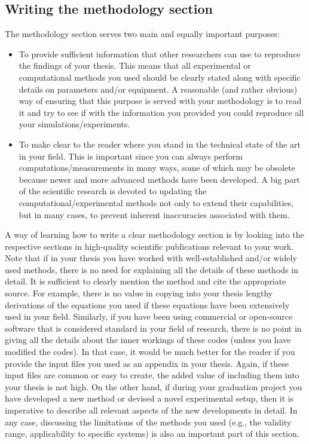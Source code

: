 \documentclass{article}
\begin{document}
\subsection{Writing the methodology section}
The methodology section serves two main and equally important purposes:
\begin{itemize}
    \item To provide sufficient information that other researchers can use to reproduce the findings of your thesis. This means that all experimental or computational methods you used should be clearly stated along with specific details on parameters and/or equipment. A reasonable (and rather obvious) way of ensuring that this purpose is served with your methodology is to read it and try to see if with the information you provided you could reproduce all your simulations/experiments. 
    \item To make clear to the reader where you stand in the technical state of the art in your field. This is important since you can always perform computations/measurements in many ways, some of which may be obsolete because newer and more advanced methods have been developed. A big part of the scientific research is devoted to updating the computational/experimental methods not only to extend their capabilities, but in many cases, to prevent inherent inaccuracies associated with them. 
\end{itemize}

A way of learning how to write a clear methodology section is by looking into the respective sections in high-quality scientific publications relevant to your work. Note that if in your thesis you have worked with well-established and/or widely used methods, there is no need for explaining all the details of these methods in detail. It is sufficient to clearly mention the method and cite the appropriate source. For example, there is no value in copying into your thesis lengthy derivations of the equations you used if these equations have been extensively used in your field. Similarly, if you have been using commercial or open-source software that is considered standard in your field of research, there is no point in giving all the details about the inner workings of these codes (unless you have modified the codes). In that case, it would be much better for the reader if you provide the input files you used as an appendix in your thesis. Again, if these input files are common or easy to create, the added value of including them into your thesis is not high. On the other hand, if during your graduation project you have developed a new method or devised a novel experimental setup, then it is imperative to describe all relevant aspects of the new developments in detail. In any case, discussing the limitations of the methods you used (e.g., the validity range, applicability to specific systems) is also an important part of this section.
\end{document}
